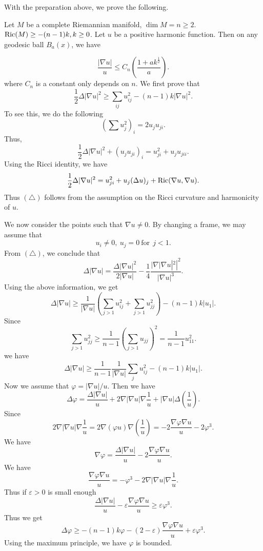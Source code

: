 With the preparation above, we prove the following.

\begin{theorem} Let $ M$ be a complete Riemannian manifold, $ \dim M = n \geq 2$. $ {\rm Ric}(M) \geq - (n-1) k , k \geq 0 $. Let  $u$ be a positive harmonic function. Then on any geodesic ball $ B_a (x) $, we have 
\end{theorem}
\[ \frac{|\nabla u|}{u}  \leq C_n \left( \frac{1+ a k ^{\frac{1}{2}}}{a} \right) .\]
%
where $C_n $ is a constant only depends on $n$.
We first prove that 
%
\begin{equation} \frac{1}{2} \Delta |\nabla u | ^2 \geq \sum _{ij} u_{ij} ^2 - (n-1) k | \nabla u|^2. \tag{$\triangle$}\end{equation}
To see this, we do the following
%
\[ \left( \sum u^2_j\right) _i = 2 u_j u_{ji}. \]
Thus,
%
\[ \frac{1}{2} \Delta |\nabla u | ^2 + ( u_j u_{ji} )_i = u ^2_{ji} + u_j u_{jii}. \]
Using the Ricci identity, we have 
%
\[ \frac{1}{2} \Delta |\nabla u| ^2 = u^2_{ji} + u _j (\Delta u)_j + {\rm Ric} (\nabla u, \nabla u) .\]
%
Thus  $ (\triangle) $ follows from the assumption on the Ricci curvature and harmonicity of $u$.

We now consider the points such that $ \nabla u \neq 0$. By changing a frame, we may assume that 
%
\[ u_i \neq 0 , \ u_j = 0 \ \mbox{for}\ \ j < 1 .\]
%
From $ (\triangle)$, we conclude that 
%
\[ \Delta | \nabla u| = \frac{\Delta | \nabla u|^2}{2 | \nabla u|} - \frac{1}{4} \frac{| \nabla | \nabla u| ^2 |^2}{| \nabla u|^3}. \]
%
Using the above information, we get 
%
\[ \Delta |\nabla u| \geq \frac{1}{| \nabla u|} \left( \sum_{j > 1} u^2_{ij} + \sum _{j>1} u^2_{jj} \right) - (n-1) k |u_1|.\]
%
Since 
%
\[ \sum _{j>1} u^2_{jj} \geq \frac{1}{n-1} \left( \sum_{j>1} u_{jj} \right) ^2 = \frac{1}{n-1} u^2_{11}.\]
%
we have 
%
\[ \Delta |\nabla u| \geq \frac{1}{n-1} \frac{1}{|\nabla u|} \sum_j u^2_{ij} - (n-1) k |u_1|.\]
%
Now we assume that $ \varphi = |\nabla u|/u$. Then we have 
%
\[ \Delta \varphi = \frac{\Delta |\nabla u|}{u} + 2 \nabla |\nabla u| \nabla \frac{1}{u} + |\nabla u| \Delta \left( \frac{1}{u} \right). \]
%
Since
\[ 2   \nabla  | \nabla u| \nabla \frac{1}{u} =  2 \nabla (\varphi u) \nabla   \left(\frac{1}{u} \right) = - 2 \frac{\nabla \varphi \nabla u}{u} - 2 \varphi ^3 .\]
%
We have 
%
\[ \nabla \varphi = \frac{\Delta |\nabla u|}{u} - 2 \frac{\nabla \varphi \nabla u}{u} .\]
%
We have 
\[\frac{\nabla \varphi \nabla u}{u} = - \varphi ^3 - 2 \nabla |\nabla u| \nabla \frac{1}{u}.
\]
Thus if $ \varepsilon > 0 $ is small enough
%
\[  \frac{\Delta |\nabla u|}{u} - \varepsilon \frac{\nabla \varphi \nabla u}{u} \geq \varepsilon \varphi ^3.\]
%
Thus we get 
%
\[ \Delta \varphi \geq - (n-1) k \varphi - (2 - \varepsilon ) \frac{\nabla \varphi \nabla u}{u} + \varepsilon \varphi^3 .\]
%
Using the maximum principle, we have $ \varphi $ is bounded.

